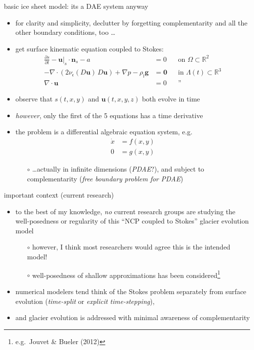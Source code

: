 \documentclass[svgnames,
               hyperref={colorlinks,citecolor=DeepPink4,linkcolor=FireBrick,urlcolor=Maroon},
               usepdftitle=false]  %
               {beamer}
\newcommand{\eps}{\epsilon}
\newcommand{\RR}{\mathbb{R}}
\newcommand{\bn}{\mathbf{n}}
\newcommand{\bu}{\mathbf{u}}
\newcommand{\bzero}{\bm{0}}
\newcommand{\rhoi}{\rho_{\text{i}}}
\begin{document}
\begin{frame}{basic ice sheet model: its a DAE system anyway}

\begin{itemize}
\item for clarity and simplicity, declutter by forgetting complementarity and all the other boundary conditions, too \dots
\item get surface kinematic equation coupled to Stokes:
\begin{align*}
\frac{\partial s}{\partial t} - \bu|_s \cdot \bn_s - a &= 0 && \text{on } \Omega \subset \RR^2 \\
- \nabla \cdot \left(2 \nu_\eps(D\bu)\, D\bu\right) + \nabla p - \rhoi \mathbf{g} &= \bzero && \text{in $\Lambda(t) \subset \RR^3$} \\
\nabla \cdot \bu &= 0 && \text{''}
\end{align*}
\item observe that $s(t,x,y)$ and $\bu(t,x,y,z)$ both evolve in time
\item \emph{however}, only the first of the 5 equations has a time derivative
\item the problem is a \alert{differential algebraic equation} system, e.g.
\begin{align*}
\dot x &= f(x,y) \\
     0 &= g(x,y)
\end{align*}

    \begin{itemize}
    \item[$\circ$] \dots actually in infinite dimensions (\emph{PDAE}?), and subject to complementarity (\emph{free boundary problem for PDAE})
    \end{itemize}
\end{itemize}
\end{frame}


\begin{frame}{important context (current research)}

\begin{itemize}
\item to the best of my knowledge, \emph{no} current research groups are studying the well-posedness or regularity of this ``NCP coupled to Stokes'' glacier evolution model
    \begin{itemize}
    \item[$\circ$] however, I think most researchers would agree this is the intended model!
    \item[$\circ$] well-posedness of shallow approximations has been considered\footnote{e.g.~Jouvet \& Bueler (2012)}
    \end{itemize}

\medskip
\item<2> numerical modelers tend think of the Stokes problem separately from surface evolution (\emph{time-split} or \emph{explicit time-stepping}),
\item<2> and glacier evolution is addressed with minimal awareness of complementarity
\end{itemize}
\end{frame}
\end{document}
